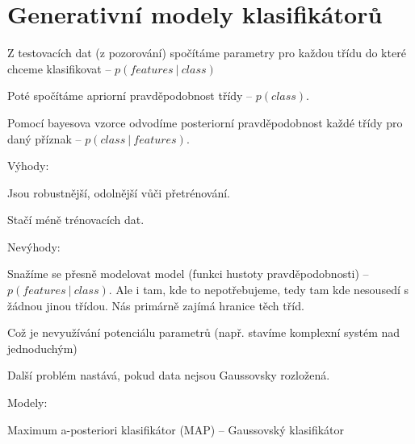 
\section{Generativní modely klasifikátorů}

\begin{compactitem}
    \item Z testovacích dat (z pozorování) spočítáme parametry pro každou třídu do které chceme klasifikovat -- $p(features ~|~ class)$

    \item Poté spočítáme apriorní pravděpodobnost třídy -- $p(class)$.

    \item Pomocí bayesova vzorce odvodíme posteriorní pravděpodobnost každé třídy pro daný příznak -- $p(class ~|~ features)$.

    \item Výhody: \begin{compactitem}
        \item Jsou robustnější, odolnější vůči přetrénování.
        \item Stačí méně trénovacích dat.
    \end{compactitem}

    \item Nevýhody: \begin{compactitem}
        \item Snažíme se přesně modelovat model (funkci hustoty pravděpodobnosti) --\break $p(features ~|~ class)$. Ale i tam, kde to nepotřebujeme, tedy tam kde nesousedí s žádnou jinou třídou. Nás primárně zajímá hranice těch tříd.
        \item Což je nevyužívání potenciálu parametrů (např. stavíme komplexní systém nad jednoduchým)
        \item Další problém nastává, pokud data nejsou Gaussovsky rozložená.
    \end{compactitem}

    \item Modely: \begin{compactitem}
        \item Maximum a-posteriori klasifikátor (MAP) -- Gaussovský klasifikátor
    \end{compactitem}

\end{compactitem}

